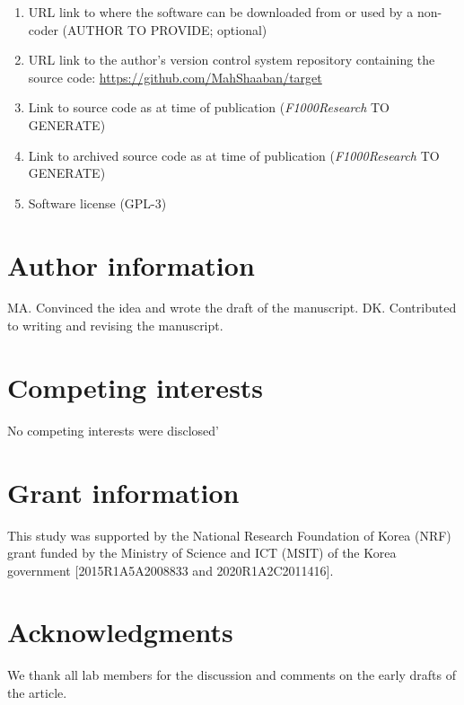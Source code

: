 \documentclass[9pt,a4paper,]{extarticle}
\begin{document}
\begin{enumerate}
\def\labelenumi{\arabic{enumi}.}
\item
  URL link to where the software can be downloaded from or used by a non-coder (AUTHOR TO PROVIDE; optional)
\item
  URL link to the author's version control system repository containing the source code: \url{https://github.com/MahShaaban/target}
\item
  Link to source code as at time of publication (\emph{F1000Research} TO GENERATE)
\item
  Link to archived source code as at time of publication (\emph{F1000Research} TO GENERATE)
\item
  Software license (GPL-3)
\end{enumerate}

\hypertarget{author-information}{%
\section{Author information}\label{author-information}}

MA. Convinced the idea and wrote the draft of the manuscript.
DK. Contributed to writing and revising the manuscript.

\hypertarget{competing-interests}{%
\section{Competing interests}\label{competing-interests}}

No competing interests were disclosed'

\hypertarget{grant-information}{%
\section{Grant information}\label{grant-information}}

This study was supported by the National Research Foundation of Korea (NRF) grant funded by the Ministry of Science and ICT (MSIT) of the Korea government {[}2015R1A5A2008833 and 2020R1A2C2011416{]}.

\hypertarget{acknowledgments}{%
\section{Acknowledgments}\label{acknowledgments}}

We thank all lab members for the discussion and comments on the early drafts of the article.

{\small}
\end{document}
